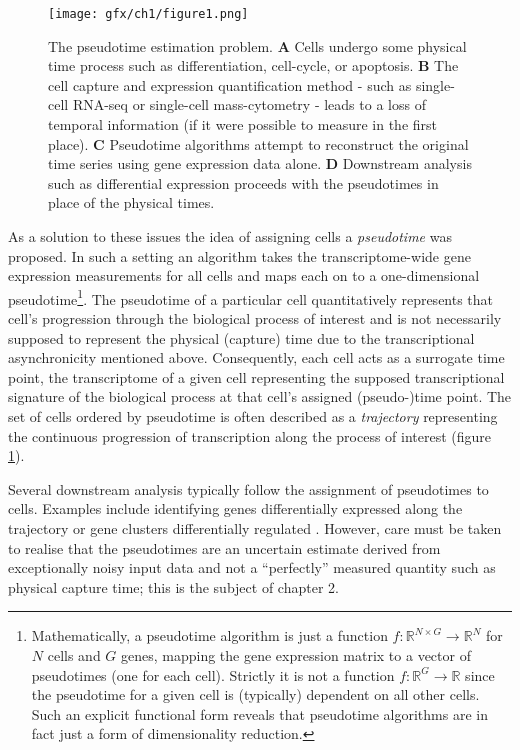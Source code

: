 \begin{figure}
\centering
  \texttt{[image: gfx/ch1/figure1.png]}
  \caption{The pseudotime estimation problem.
\textbf{A} Cells undergo some physical time process such as differentiation, cell-cycle, or apoptosis.
\textbf{B} The cell capture and expression quantification method - such as single-cell RNA-seq or single-cell mass-cytometry - leads to a loss of temporal information (if it were possible to measure in the first place).
\textbf{C} Pseudotime algorithms attempt to reconstruct the original time series using gene expression data alone.
\textbf{D} Downstream analysis such as differential expression proceeds with the pseudotimes in place of the physical times.
  } \label{fig:pseudotime}
\end{figure}

As a solution to these issues the idea of assigning cells a \emph{pseudotime} was proposed. In such a setting an algorithm takes the transcriptome-wide gene expression measurements for all cells and maps each on to a one-dimensional pseudotime\footnote{Mathematically, a pseudotime algorithm is just a function $f: \mathbb{R}^{N\times G} \rightarrow \mathbb{R}^N$ for $N$ cells and $G$ genes, mapping the gene expression matrix to a vector of pseudotimes (one for each cell). Strictly it is not a function $f: \mathbb{R}^G \rightarrow \mathbb{R}$ since the pseudotime for a given cell is (typically) dependent on all other cells. Such an explicit functional form reveals that pseudotime algorithms are in fact just a form of dimensionality reduction.}.
The pseudotime of a particular cell quantitatively represents that cell's progression through the biological process of interest and is not necessarily supposed to represent the physical (capture) time due to the transcriptional asynchronicity mentioned above. Consequently, each cell acts as a surrogate time point, the transcriptome of a given cell representing the supposed transcriptional signature of the biological process at that cell's assigned (pseudo-)time point. The set of cells ordered by pseudotime is often described as a \emph{trajectory} representing the continuous progression of transcription along the process of interest (figure \ref{fig:pseudotime}).

Several downstream analysis typically follow the assignment of pseudotimes to cells. Examples include identifying genes differentially expressed along the trajectory \cite{campbell2016switchde} or gene clusters differentially regulated \cite{Trapnell2014-xi}. However, care must be taken to realise that the pseudotimes are an uncertain estimate derived from exceptionally noisy input data and not a ``perfectly'' measured quantity such as physical capture time; this is the subject of chapter 2.

